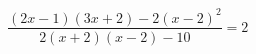 \begin{ex}[type=equation]
	\begin{condition}
		$\dfrac{(2x - 1)(3x+2) - 2(x-2)^2}{2(x+ 2)(x - 2) -10}=2$
	\end{condition}
\end{ex}